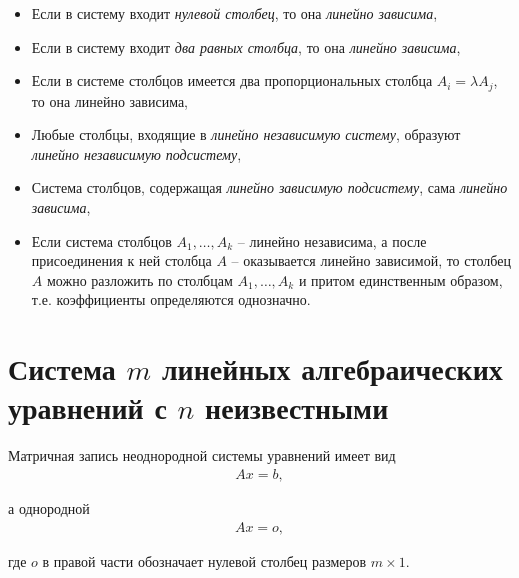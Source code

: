 \documentclass[%
	11pt,
	a4paper,
	utf8,
		]{article}
\begin{document}
\begin{itemize}
	\item Если в систему входит \emph{нулевой столбец}, то она \emph{линейно зависима},
	
	\item Если в систему входит \emph{два равных столбца}, то она \emph{линейно зависима},
	
	\item Если в системе столбцов имеется два пропорциональных столбца $ A_i = \lambda A_j $, то она линейно зависима,
	
	\item Любые столбцы, входящие в \emph{линейно независимую систему}, образуют \emph{линейно независимую подсистему},
	
	\item Система столбцов, содержащая \emph{линейно зависимую подсистему}, сама \emph{линейно зависима},
	
	\item Если система столбцов $ A_1, \ldots,A_k $ -- линейно независима, а после присоединения к ней столбца $ A $ -- оказывается линейно зависимой, то столбец $ A $ можно разложить по столбцам $ A_1, \ldots, A_k $ и притом единственным образом, т.е. коэффициенты определяются однозначно.
\end{itemize}

\section{Система $ m $ линейных алгебраических уравнений с $ n $ неизвестными}

Матричная запись неоднородной системы уравнений имеет вид
\vspace*{-3mm}
\begin{align*}
	A x = b,
\end{align*}

\vspace*{-3mm}
а однородной
\vspace*{-3mm}
\begin{align*}
	A x = o,
\end{align*}

\vspace*{-3mm}
где $ o $ в правой части обозначает нулевой столбец размеров $ m \times 1 $.
\end{document}
